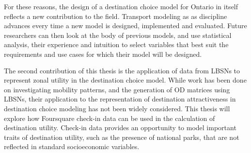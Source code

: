 For these reasons, the design of a destination choice model for Ontario in itself reflects a new contribution to the field.  Transport modeling as as discipline advances every time a new model is designed, implemented and evaluated. Future researchers can then look at the body of previous models, and use statistical analysis, their experience and intuition to select variables that best suit the requirements and use cases for which their model will be designed. 

The second contribution of this thesis is the application of data from LBSNs to represent zonal utility in the destination choice model. While work has been done on investigating mobility patterns, and the generation of OD matrices using LBSNs, their application to the representation of destination attractiveness in destination choice modeling has not been widely considered. This thesis will explore how Foursquare check-in data can be used in the calculation of destination utility. Check-in data provides an opportunity to model important traits of destination utility, such as the presence of national parks, that are not reflected in standard socioeconomic variables.

